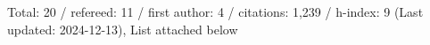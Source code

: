 Total: 20 / refereed: 11 / first author: 4 / citations: 1,239 / h-index: 9 (Last updated: 2024-12-13), List attached below
